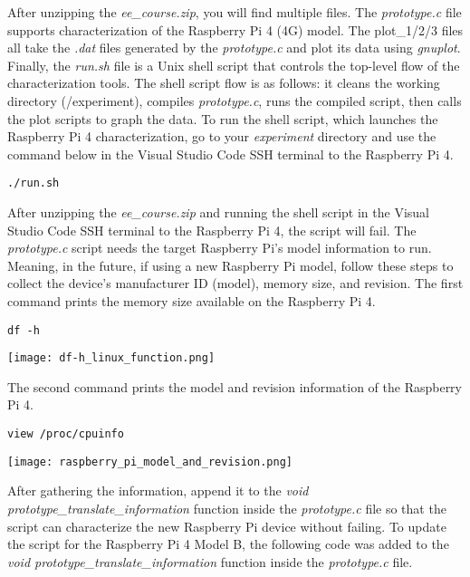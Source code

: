 \documentclass[journal]{IEEEtran}
\begin{document}
    After unzipping the \emph{ee\_course.zip}, you will find multiple files. 
    The \emph{prototype.c} file supports characterization of the Raspberry Pi 4 (4G) model. 
    The plot\_1/2/3 files all take the \emph{.dat} files generated by the \emph{prototype.c} and plot its data using \emph{gnuplot}.
    Finally, the \emph{run.sh} file is a Unix shell script that controls the top-level flow of the characterization tools. 
    The shell script flow is as follows: it cleans the working directory (/experiment), compiles \emph{prototype.c}, runs the compiled script, then calls the plot scripts to graph the data.
    To run the shell script, which launches the Raspberry Pi 4 characterization, go to your \emph{experiment} directory and use the command below in the Visual Studio Code SSH terminal to the Raspberry Pi 4.

    \begin{lstlisting}[frame=single]
        ./run.sh
    \end{lstlisting}

    After unzipping the \emph{ee\_course.zip} and running the shell script in the Visual Studio Code SSH terminal to the Raspberry Pi 4, the script will fail.
    The \emph{prototype.c} script needs the target Raspberry Pi's model information to run. 
    Meaning, in the future, if using a new Raspberry Pi model, follow these steps to collect the device's manufacturer ID (model), memory size, and revision. 
    The first command prints the memory size available on the Raspberry Pi 4.

    \begin{lstlisting}[frame=single]
        df -h
    \end{lstlisting}

    \texttt{[image: df-h\_linux\_function.png]}

    The second command prints the model and revision information of the Raspberry Pi 4.

    \begin{lstlisting}[frame=single]
        view /proc/cpuinfo
    \end{lstlisting}

    \texttt{[image: raspberry\_pi\_model\_and\_revision.png]}

    After gathering the information, append it to the \emph{void prototype\_translate\_information} function inside the \emph{prototype.c} file so that the script can characterize the new Raspberry Pi device without failing.
    To update the script for the Raspberry Pi 4 Model B, the following code was added to the \emph{void prototype\_translate\_information} function inside the \emph{prototype.c} file. 
\end{document}
